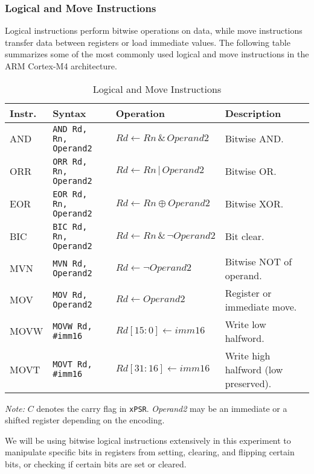\subsubsection{Logical and Move Instructions}
Logical instructions perform bitwise operations on data, while move instructions transfer data between registers or load immediate values. The following table summarizes some of the most commonly used logical and move instructions in the ARM Cortex-M4 architecture.
\begin{table}[H]
\centering
\caption{Logical and Move Instructions}
\small
\begin{tabularx}{\linewidth}{@{}l l l X@{}}
\toprule
\textbf{Instr.} & \textbf{Syntax} & \textbf{Operation} & \textbf{Description} \\
\midrule
AND  & \texttt{AND Rd, Rn, Operand2} & $Rd \leftarrow Rn \,\&\, Operand2$ & Bitwise AND. \\
ORR  & \texttt{ORR Rd, Rn, Operand2} & $Rd \leftarrow Rn \,|\, Operand2$ & Bitwise OR. \\
EOR  & \texttt{EOR Rd, Rn, Operand2} & $Rd \leftarrow Rn \oplus Operand2$ & Bitwise XOR. \\
BIC  & \texttt{BIC Rd, Rn, Operand2} & $Rd \leftarrow Rn \,\&\, \neg Operand2$ & Bit clear. \\
MVN  & \texttt{MVN Rd, Operand2}     & $Rd \leftarrow \neg Operand2$ & Bitwise NOT of operand. \\
MOV  & \texttt{MOV Rd, Operand2}     & $Rd \leftarrow Operand2$ & Register or immediate move. \\
MOVW & \texttt{MOVW Rd, \#imm16}     & $Rd[15{:}0] \leftarrow imm16$ & Write low halfword. \\
MOVT & \texttt{MOVT Rd, \#imm16}     & $Rd[31{:}16] \leftarrow imm16$ & Write high halfword (low preserved). \\
\bottomrule
\end{tabularx}

\vspace{2pt}
\footnotesize\emph{Note:} $C$ denotes the carry flag in \texttt{xPSR}. \emph{Operand2} may be an immediate or a shifted register depending on the encoding.
\end{table}
We will be using bitwise logical instructions extensively in this experiment to manipulate specific bits in registers from setting, clearing, and flipping certain bits, or checking if certain bits are set or cleared.
